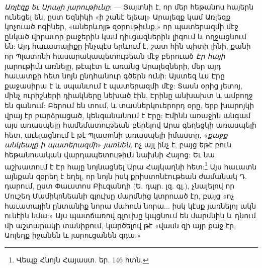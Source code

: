 \documentclass{article}
\begin{document}
{\emph{Առլէզք եւ Արայի յարութիւնը}: — Յայտնի է, որ մեր հեթանոս հայերն ունեցել են, ըստ Եզնիկի «ի շանէ ելեալ» Արալեզք կամ Առլեզք կոչուած ոգիներ, «աներևոյթ զօրութիւնք,» որ պատերազմի մէջ ընկած վիրաւոր քաջերին կամ դիւցազներին լիգում և ողջացնում են: Այդ հաւատալիքը ինչպէս երևում է, շատ հին պիտի լինի, քանի որ Պլատոնի հասարակապետութեան մէջ բերուած \emph{Էր հայի} յարութիւն առնելը, թէպէտ և առանց Արալեզների, մեր այդ հաւատքի հետ նոյն ընդհանուր գծերն ունի: Այստեզ ևս Էրը քաջասիրա է և սպանւում է պատերազմի մէջ: Տասն օրից յետոյ, մինչ ուրիշների դիակները նեխած էին, Էրինը անխախտ և ամբողջ են գանում: Բերում են տում, և տասներկուերորդ օրը, երբ խարոյկի վրայ էր բարձրացած, կենգանանում է Էրը: Էմինն առաջին անգամ այս առասպելը համեմատութեան բերելով Արա գեղեցկի առասպելի հետ, աւելացնում է թէ Պլատոնի առասպելի իմաստը, «\emph{քաջք անկեալք ի պատերազմի}» \emph{յառնեն}, ոչ այլ ինչ է, բայց եթէ բուն հեթանոսական վարդապետութիւն նախնի Հայոց: Եւ նա աշխատում է Էր հայը նոյնացնել Արա Հայկաղնի հետ:\footnote{Վեպք Հնոյն Հայաստ. եր. 146 հտն.} Այս հաւատն այնքան զօրեղ է եղել, որ նոյն իսկ քրիստոնէութեան ժամանակ Դ. դարում, ըստ Փաւստոս Բիւզանդի (Ե. դպր. լզ. գլ.), չնայելով որ Մուշեղ Մամիկոնեանի գլուխը մարմնից կտրուած էր, բայց «ոչ հաւատային ընտանիք նորա մահուն նորա... իսկ կէսք յառնելոյ ակն ունէին նմա:» Այս պատճառով գլուխը կպցնում են մարմնին և դնում մի աշտարակի տանիքում, կարծելով թէ «վասն զի այր քաջ էր, Աոլեղք իջանեն և յարուցանեն զդա:»

}
\end{document}
